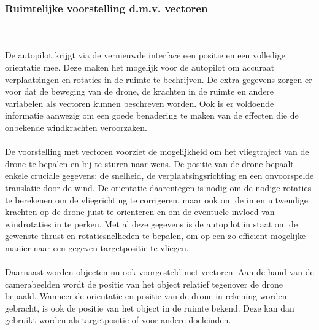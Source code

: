 \subsubsection{Ruimtelijke voorstelling d.m.v. vectoren}
\\
\\
De autopilot krijgt via de vernieuwde interface een positie en een volledige orientatie mee. Deze maken het mogelijk voor de autopilot om accuraat verplaatsingen en rotaties in de ruimte te bechrijven. De extra gegevens zorgen er voor dat de beweging van de drone, de krachten in de ruimte en andere variabelen als vectoren kunnen beschreven worden. Ook is er voldoende informatie aanwezig om een goede benadering te maken van de effecten die de onbekende windkrachten veroorzaken.
\\
\\
De voorstelling met vectoren voorziet de mogelijkheid om het vliegtraject van de drone te bepalen en bij te sturen naar wens. De positie van de drone bepaalt enkele cruciale gegevens: de snelheid, de verplaatsingsrichting en een onvoorspelde translatie door de wind. De orientatie daarentegen is nodig om de nodige rotaties te berekenen om de vliegrichting te corrigeren, maar ook om de in en uitwendige krachten op de drone juist te orienteren en om de eventuele invloed van windrotaties in te perken. Met al deze gegevens is de autopilot in staat om de gewenste thrust en rotatiesnelheden te bepalen, om op een zo efficient mogelijke manier naar een gegeven targetpositie te vliegen.
\\
\\
Daarnaast worden objecten nu ook voorgesteld met vectoren. Aan de hand van de camerabeelden wordt de positie van het object relatief tegenover de drone bepaald. Wanneer de orientatie en positie van de drone in rekening worden gebracht, is ook de positie van het object in de ruimte bekend. Deze kan dan gebruikt worden als targetpositie of voor andere doeleinden.
